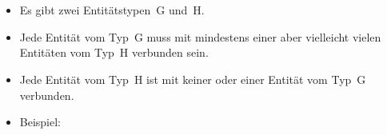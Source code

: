 %
\section{}%
%
\begin{frame}[t]%
\frametitle{}%
\begin{itemize}%
\item Es gibt zwei Entitätstypen~G und~H.%
\item<2-> Jede Entität vom Typ~G muss mit mindestens einer aber vielleicht vielen Entitäten vom Typ~H verbunden sein.%
\item<3-> Jede Entität vom Typ~H ist mit keiner oder einer Entität vom Typ~G verbunden.
\item<4-> Beispiel:%
\end{itemize}%
%
%
\end{frame}%
%
